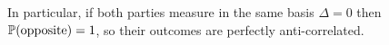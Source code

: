 


In particular, if both parties measure in the same basis
\(
\Delta=0
\)
then
\(
\operatorname{\mathbb{P}}(\text{opposite})=1
\),
so their outcomes are perfectly anti-correlated.








